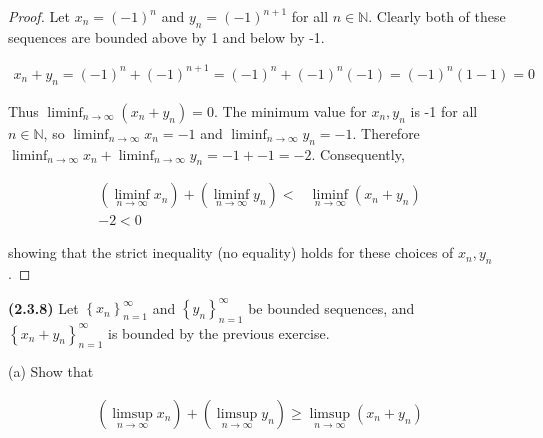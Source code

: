 \documentclass[12pt]{article}
\newcommand{\liminftoinf}[1][n]{\liminf_{ {#1} \to \infty}}
\newcommand{\limsuptoinf}[1][n]{\limsup_{ {#1} \to \infty}}
\newcommand{\seq}[2][n]{\left\{ {#2} \right\}_{#1=1}^\infty}
\newcommand{\paren}[1]{\left( {#1} \right)}
\newcommand{\bN}{\mathbb{N}}
\begin{document}
\begin{proof}
	Let $x_n=(-1)^n$ and $y_n=(-1)^{n+1}$ for all $n\in\bN$. Clearly both of these sequences are bounded above by 1 and below by -1.
	
\begin{align*}
	x_n+y_n=(-1)^n+(-1)^{n+1}=(-1)^n+(-1)^n(-1)=(-1)^n(1-1)=0
\end{align*}

Thus $\liminftoinf\paren{x_n+y_n}=0$. The minimum value for $x_n, y_n$ is -1 for all $n\in\bN$, so $\liminftoinf x_n=-1$ and $\liminftoinf y_n=-1$. Therefore $\liminftoinf x_n+\liminftoinf y_n=-1+-1=-2$. Consequently,

\begin{align*}
	\paren{\liminftoinf x_n}+\paren{\liminftoinf y_n}<&\liminftoinf\paren{x_n+y_n} \\
	-2<0
\end{align*}

\noindent showing that the strict inequality (no equality) holds for these choices of $x_n,y_n$.
\end{proof}

\newpage

\noindent \textbf{(2.3.8)}  Let $\seq{x_n}$ and $\seq{y_n}$ be bounded sequences, and $\seq{x_n+y_n}$ is bounded by the previous exercise.

(a) Show that

\begin{align*}
	\paren{\limsuptoinf x_n}+\paren{\limsuptoinf y_n}\ge\limsuptoinf\paren{x_n+y_n}
\end{align*}
\end{document}
